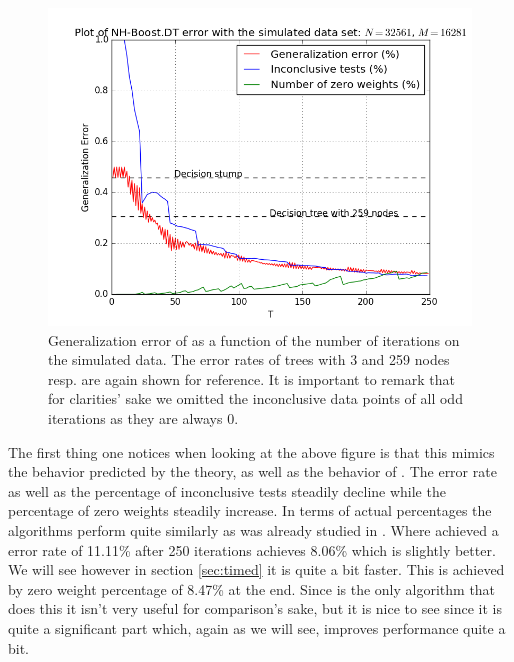 \begin{figure}[!ht]
  \centering
      \includegraphics[width=\graphWidth]{generated/NHGD.png}
  \caption{Generalization error of \NHB as a function of the number of iterations on the simulated data. The error rates of trees with 3 and 259 nodes resp. are again shown for reference. It is important to remark that for clarities' sake we omitted the inconclusive data points of all odd iterations as they are always 0.}
      \label{fig:NHBGD}
\end{figure}
 \FloatBarrier
 \par The first thing one notices when looking at the above figure is that this mimics the behavior predicted by the theory, as well as the behavior of \adaB. The error rate as well as the percentage of inconclusive tests steadily decline while the percentage of zero weights steadily increase. In terms of actual percentages the algorithms perform quite similarly as was already studied in \cite{Luo2014}. Where \adaB achieved a error rate of 11.11\% after 250 iterations \NHB achieves 8.06\% which is slightly better. We will see however in section \ref{sec:timed} it is quite a bit faster. This is achieved by zero weight percentage of 8.47\% at the end. Since \NHB is the only algorithm that does this it isn't very useful for comparison's sake, but it is nice to see since it is quite a significant part which, again as we will see, improves performance quite a bit.  
